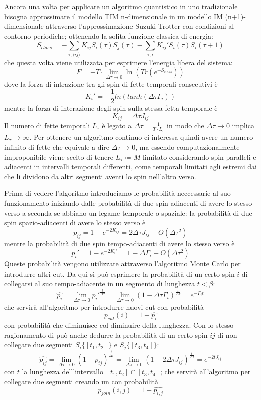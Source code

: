 Ancora una volta per applicare un algoritmo quantistico in uno tradizionale bisogna approssimare il modello TIM n-dimensionale in un modello IM (n+1)-dimensionale attraverso l'approssimazione Suzuki-Trotter con condizioni al contorno periodiche; ottenendo la solita funzione classica di energia:
$$S_{class} = - \sum_{\tau,\langle ij \rangle} K_{ij} S_i(\tau) S_j(\tau) - \sum_{\tau, i} K_{ij}' S_i(\tau) S_i(\tau+1)$$
che questa volta viene utilizzata per esprimere l'energia libera del sistema:
$$F = - T \cdot \lim_{\Delta \tau \to 0} \ln(Tr(e^{-S_{class}}))$$
dove la forza di intrazione tra gli spin di fette temporali consecutivi è
$$K_{i}' = - \frac{1}{2} ln( tanh( \Delta \tau \Gamma_i) )$$
mentre la forza di interazione degli spin sulla stessa fetta temporale è
$$K_{ij} = \Delta \tau J_{ij}$$
Il numero di fette temporali $L_{\tau}$ è legato a $\Delta \tau = \frac{1}{T \cdot L_{\tau}}$ in modo che $\Delta \tau \to 0$ implica $L_{\tau} \to \infty$.
Per ottenere un algoritmo continuo ci interessa quindi avere un numero infinito di fette che equivale a dire $\Delta \tau \to 0$, ma essendo computazionalmente improponibile viene scelto di tenere $L_{\tau} \coloneqq M$ limitato considerando spin paralleli e adiacenti in intervalli temporali differenti, come  temporali limitati agli estremi dai  che li dividono da altri segmenti aventi lo spin nell'altro verso.

Prima di vedere l'algoritmo introduciamo le probabilità neccessarie al suo funzionamento iniziando dalle probabilità di due spin adiacenti di avere lo stesso verso a seconda se abbiano un legame temporale o spaziale:
la probabilità di due spin spazio-adiacenti di avere lo stesso verso è
$$p_{ij} = 1 - e^{-2K_{ij}} = 2\Delta \tau J_{ij} + O(\Delta \tau^2)$$
mentre la probabilità di due spin tempo-adiacenti di avere lo stesso verso è
$$p_i' = 1 - e^{-2K_{i}'} = 1 - \Delta \Gamma_{i} + O(\Delta \tau^2)$$
Queste probabilità vengono utilizzate attraverso l'algoritmo Monte Carlo per introdurre altri cut.
Da qui si può esprimere la probabilità di un certo spin $i$ di collegarsi al suo tempo-adiacente in un segmento di lunghezza $t < \beta$:
$$\hat{p_i} = \lim_{\Delta \tau \to 0} p_i'^{\frac{t}{\Delta \tau}} = \lim_{\Delta \tau \to 0} (1 - \Delta \tau \Gamma_i)^\frac{t}{\Delta \tau} = e^{- \Gamma_i t}$$
che servirà all'algoritmo per introdurre nuovi cut con probabilità
$$p_{cut}(i) = 1 - \hat{p_i}$$
con probabilità che diminuisce col diminuire della lunghezza.
Con lo stesso ragionamento di può anche dedurre la probabilità di un certo spin $ij$ di non collegare due segmenti $S_i\{[t_1, t_2]\}$ e $S_j\{[t_3, t_4]\}$:
$$\hat{p_{ij}} = \lim_{\Delta \tau \to 0} (1 - p_{ij})^\frac{t}{\Delta \tau} = \lim_{\Delta \tau \to 0} (1 - 2\Delta \tau J_{ij})^\frac{t}{\Delta \tau} = e^{-2 t J_{ij}}$$
con $t$ la lunghezza dell'intervallo $[t_1, t_2] \cap [t_3, t_4]$; che servirà all'algoritmo per collegare due segmenti creando un  con probabilità
$$p_{join}(i,j) = 1 - \hat{p_{i,j}}$$

